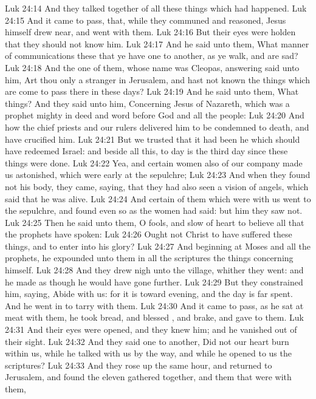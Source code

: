 \vs Luk 24:14 And they talked together of all these things which had happened.
\vs Luk 24:15 And it came to pass, that, while they communed  and reasoned, Jesus himself drew near, and went with them.
\vs Luk 24:16 But their eyes were holden that they should not know him.
\vs Luk 24:17 And he said unto them, What manner of communications  these that ye have one to another, as ye walk, and are sad?
\vs Luk 24:18 And the one of them, whose name was Cleopas, answering said unto him, Art thou only a stranger in Jerusalem, and hast not known the things which are come to pass there in these days?
\vs Luk 24:19 And he said unto them, What things? And they said unto him, Concerning Jesus of Nazareth, which was a prophet mighty in deed and word before God and all the people:
\vs Luk 24:20 And how the chief priests and our rulers delivered him to be condemned to death, and have crucified him.
\vs Luk 24:21 But we trusted that it had been he which should have redeemed Israel: and beside all this, to day is the third day since these things were done.
\vs Luk 24:22 Yea, and certain women also of our company made us astonished, which were early at the sepulchre;
\vs Luk 24:23 And when they found not his body, they came, saying, that they had also seen a vision of angels, which said that he was alive.
\vs Luk 24:24 And certain of them which were with us went to the sepulchre, and found  even so as the women had said: but him they saw not.
\vs Luk 24:25 Then he said unto them, O fools, and slow of heart to believe all that the prophets have spoken:
\vs Luk 24:26 Ought not Christ to have suffered these things, and to enter into his glory?
\vs Luk 24:27 And beginning at Moses and all the prophets, he expounded unto them in all the scriptures the things concerning himself.
\vs Luk 24:28 And they drew nigh unto the village, whither they went: and he made as though he would have gone further.
\vs Luk 24:29 But they constrained him, saying, Abide with us: for it is toward evening, and the day is far spent. And he went in to tarry with them.
\vs Luk 24:30 And it came to pass, as he sat at meat with them, he took bread, and blessed , and brake, and gave to them.
\vs Luk 24:31 And their eyes were opened, and they knew him; and he vanished out of their sight.
\vs Luk 24:32 And they said one to another, Did not our heart burn within us, while he talked with us by the way, and while he opened to us the scriptures?
\vs Luk 24:33 And they rose up the same hour, and returned to Jerusalem, and found the eleven gathered together, and them that were with them,
